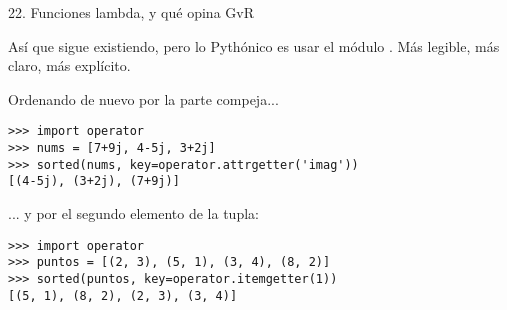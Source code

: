 \begin{frame}[fragile]{22. \large Funciones lambda, y qué opina GvR}
  \small
  \begin{block}{}
    \centering
    Así que  sigue existiendo, pero lo Pythónico es
    usar el módulo .  Más legible, más claro, más
    explícito.
  \end{block}

  \footnotesize
  \begin{exampleblock}
    {Ordenando de nuevo por la parte compeja...}
    \begin{lstlisting}
>>> import operator
>>> nums = [7+9j, 4-5j, 3+2j]
>>> sorted(nums, key=operator.attrgetter('imag'))
[(4-5j), (3+2j), (7+9j)]
    \end{lstlisting}
  \end{exampleblock}

  \begin{exampleblock}
    {... y por el segundo elemento de la tupla:}
    \begin{lstlisting}
>>> import operator
>>> puntos = [(2, 3), (5, 1), (3, 4), (8, 2)]
>>> sorted(puntos, key=operator.itemgetter(1))
[(5, 1), (8, 2), (2, 3), (3, 4)]
    \end{lstlisting}
  \end{exampleblock}
\end{frame}
